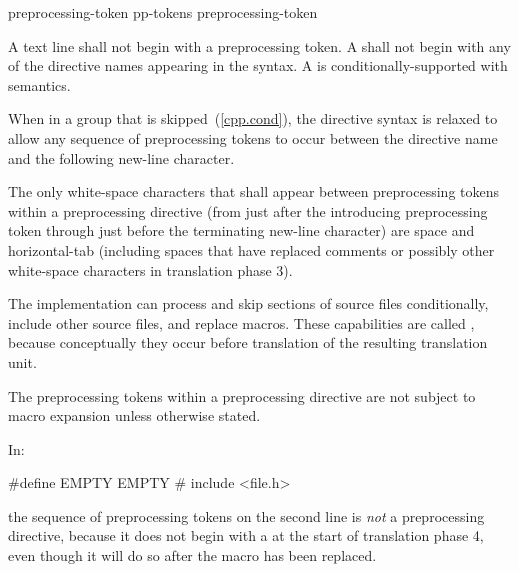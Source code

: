 \begin{bnf}
\br
    preprocessing-token\br
    pp-tokens preprocessing-token
\end{bnf}

\begin{bnf}
\br
\end{bnf}

\pnum
A text line shall not begin with a \tcode{\#} preprocessing token.
A  shall not begin
with any of the directive names appearing in the syntax.
A  is
conditionally-supported with
semantics.

\pnum
When in a group that is skipped~(\ref{cpp.cond}), the directive
syntax is relaxed to allow any sequence of preprocessing tokens to occur between
the directive name and the following new-line character.

\pnum
The only white-space characters that shall appear
between preprocessing tokens
within a preprocessing directive
(from just after the introducing
\tcode{\#}
preprocessing token through just before the terminating new-line character)
are space and horizontal-tab
(including spaces that have replaced comments
or possibly other white-space characters
in translation phase 3).

\pnum
The implementation can
process and skip sections of source files conditionally,
include other source files,
and replace macros.
These capabilities are called
,
because conceptually they occur
before translation of the resulting translation unit.

\pnum
The preprocessing tokens within a preprocessing directive
are not subject to macro expansion unless otherwise stated.

\begin{example} In:

\begin{codeblock}
#define EMPTY
EMPTY   #   include <file.h>
\end{codeblock}

the sequence of preprocessing tokens on the second line is \textit{not}
a preprocessing directive, because it does not begin with a \tcode{\#} at the start of
translation phase 4, even though it will do so after the macro 
has been replaced.\end{example}

